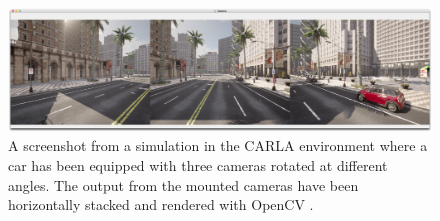 \begin{figure}[ht]
    \centering
    \includegraphics[width=1.0\textwidth]{figures/carla-3-camera-setup.png}
    \caption[Screenshot from the CARLA simulator.]{A screenshot from a simulation in the CARLA environment where a car has been equipped with three cameras rotated at different angles. The output from the mounted cameras have been horizontally stacked and rendered with OpenCV \cite{opencv_library}.}
    \label{fig:carla-3-camera-setup}
\end{figure}